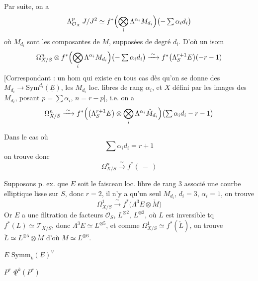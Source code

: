 \documentclass[11pt,a4paper]{article}
\begin{document}
Par suite, on a
\[
  \Lambda^{p}_{\mathcal{O}_X}\, J/J^{2} \simeq
  f^{*}\Bigl(\bigotimes_{i} \Lambda^{\alpha_i} M_{d_i}\Bigr)
  \bigl(-\textstyle\sum \alpha_i d_i\bigr)
\]
où $M_{d_i}$ sont les composantes  de $M$, supposées de
degré $d_i$. D'où un isom
\[
  \Omega^{n}_{X/S} \otimes f^{*}\Bigl(\bigotimes_{i} \Lambda^{\alpha_i}
  M_{d_i}\Bigr)\bigl(-\textstyle\sum \alpha_i d_i\bigr)
  \xrightarrow{\;\sim\;} f^{*}\bigl(\Lambda^{r+1}_{S} E\bigr)(-r-1)
\]
[Correspondant : un hom qui existe en tous cas dès qu'on se donne des
$M_{d_i} \to \mathrm{Sym}^{d_i}(\underline{E})$, les $M_{d_i}$ loc. libres
de rang $\alpha_i$, et $X$ défini par  les
images des $M_{d_i}$, posant $p = \sum \alpha_i$, $n = r - p$], i.e. on a
\[
  \Omega^{n}_{X/S} \xrightarrow{\;\sim\;}
  f^{*}\Bigl(\bigl(\Lambda^{r+1}_{S} E\bigr) \otimes
  \bigotimes_{i} \Lambda^{\alpha_i} \check{M}_{d_i}\Bigr)
  \bigl(\textstyle\sum \alpha_i d_i - r - 1\bigr)
\]

Dans le cas où
\[
  \textstyle\sum \alpha_i d_i = r+1
\]
on trouve donc
\[
  \Omega^{n}_{X/S} \xrightarrow{\;\sim\;} f^{*}(\ -\ )
\]

Supposons p. ex. que $E$ soit le faisceau loc. libre de rang $3$ associé
 une courbe elliptique lisse sur $S$, donc $r = 2$, il n'y a qu'un
seul $M_{d_i}$, $d_i = 3$, $\alpha_i = 1$, on trouve
\[
  \Omega^{1}_{X/S} \xrightarrow{\;\sim\;} f^{*}\bigl(\Lambda^{3} E \otimes
  \check{M}\bigr)
\]
Or $E$ a une filtration de facteurs $\mathcal{O}_S$, 
$L^{\otimes 2}$, $L^{\otimes 3}$, où $L$ est inversible tq
$f^{*}(L) \simeq \mathcal{T}_{X/S}$, donc $\Lambda^{3} E \simeq L^{\otimes 5}$,
et comme $\Omega^{1}_{X/S} \simeq f^{*}(\check{L})$, on trouve
$\check{L} \simeq L^{\otimes 5} \otimes \check{M}$ d'où $M \simeq
L^{\otimes 6}$.


$E$ \qquad $\mathrm{Symm}_k(\underline{E})^{\vee}$

$P^{r}$ \qquad $\underline{\Phi}^{k}(P^{r})$
\end{document}
